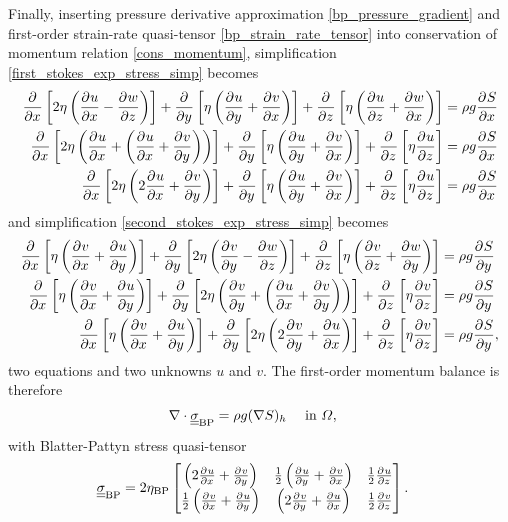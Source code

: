 Finally, inserting pressure derivative approximation \cref{bp_pressure_gradient} and first-order strain-rate quasi-tensor \cref{bp_strain_rate_tensor} into conservation of momentum relation \cref{cons_momentum}, simplification \cref{first_stokes_exp_stress_simp} becomes
{\tiny
\begin{align}
  \parder{}{x} \left[2\eta \left( \parder{u}{x} - \parder{w}{z} \right) \right]  + \parder{}{y} \left[\eta \left( \parder{u}{y} + \parder{v}{x} \right) \right] + \parder{}{z} \left[\eta \left( \parder{u}{z} + \parder{w}{x} \right) \right] &= \rho g\parder{S}{x} \notag \\
  \parder{}{x} \left[2\eta \left( \parder{u}{x} + \left( \parder{u}{x} + \parder{v}{y} \right)\right) \right]  + \parder{}{y} \left[\eta \left( \parder{u}{y} + \parder{v}{x} \right) \right] + \parder{}{z} \left[\eta \parder{u}{z} \right] &= \rho g\parder{S}{x} \notag \\
  \label{first_stokes_exp_strain_simp}
  \parder{}{x} \left[2\eta \left( 2\parder{u}{x} + \parder{v}{y} \right) \right]  + \parder{}{y} \left[\eta \left( \parder{u}{y} + \parder{v}{x} \right) \right] + \parder{}{z} \left[\eta \parder{u}{z} \right] &= \rho g\parder{S}{x}
\end{align}}
and simplification \cref{second_stokes_exp_stress_simp} becomes 
{\tiny
\begin{align}
  \parder{}{x} \left[\eta \left( \parder{v}{x} + \parder{u}{y} \right) \right]  + \parder{}{y} \left[2\eta \left( \parder{v}{y} - \parder{w}{z} \right) \right] + \parder{}{z} \left[\eta \left( \parder{v}{z} + \parder{w}{y} \right) \right] &= \rho g \parder{S}{y} \notag \\
  \parder{}{x} \left[\eta \left( \parder{v}{x} + \parder{u}{y} \right) \right]  + \parder{}{y} \left[2\eta \left( \parder{v}{y} + \left(\parder{u}{x} + \parder{v}{y} \right)\right) \right] + \parder{}{z} \left[\eta \parder{v}{z} \right] &= \rho g \parder{S}{y} \notag \\
  \label{second_stokes_exp_strain_simp}
  \parder{}{x} \left[\eta \left( \parder{v}{x} + \parder{u}{y} \right) \right]  + \parder{}{y} \left[2\eta \left( 2\parder{v}{y} + \parder{u}{x} \right) \right] + \parder{}{z} \left[\eta \parder{v}{z} \right] &= \rho g \parder{S}{y},
\end{align}}
two equations and two unknowns $u$ and $v$.  The first-order momentum balance is therefore
\begin{align}
  \label{bp_cons_momentum}
  \nabla \cdot \ranktwo{\sigma}_{\text{BP}} &= \rho g (\nabla S)_h &&\text{ in } \Omega,
\end{align}
with Blatter-Pattyn stress quasi-tensor
\begin{align}
  \label{bp_stress_tensor}
  \ranktwo{\sigma}_{\text{BP}} &=
  2 \eta_{\text{BP}} 
  \begin{bmatrix}
       \left( 2\parder{u}{x} + \parder{v}{y} \right) & \frac{1}{2}\left( \parder{u}{y} + \parder{v}{x} \right) & \frac{1}{2} \parder{u}{z} \\
       \frac{1}{2}\left( \parder{v}{x} + \parder{u}{y} \right) & \left( 2\parder{v}{y} + \parder{u}{x} \right) & \frac{1}{2} \parder{v}{z}
     \end{bmatrix}.
\end{align}

